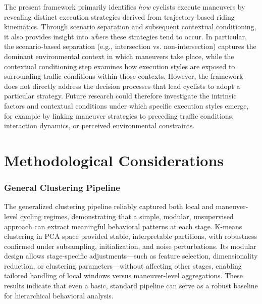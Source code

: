 The present framework primarily identifies \textit{how} cyclists execute maneuvers by revealing distinct execution strategies derived from trajectory-based riding kinematics. Through scenario separation and subsequent contextual conditioning, it also provides insight into \textit{where} these strategies tend to occur. In particular, the scenario-based separation (e.g., intersection vs. non-intersection) captures the dominant environmental context in which maneuvers take place, while the contextual conditioning step examines how execution styles are exposed to surrounding traffic conditions within those contexts. However, the framework does not directly address the decision processes that lead cyclists to adopt a particular strategy. Future research could therefore investigate the intrinsic factors and contextual conditions under which specific execution styles emerge, for example by linking maneuver strategies to preceding traffic conditions, interaction dynamics, or perceived environmental constraints.









\iffalse
\section{Methodological Considerations}


\subsubsection{General Clustering Pipeline}
The generalized clustering pipeline reliably captured both local and maneuver-level cycling regimes, demonstrating that a simple, modular, unsupervised approach can extract meaningful behavioral patterns at each stage. K-means clustering in PCA space provided stable, interpretable partitions, with robustness confirmed under subsampling, initialization, and noise perturbations. Its modular design allows stage-specific adjustments—such as feature selection, dimensionality reduction, or clustering parameters—without affecting other stages, enabling tailored handling of local windows versus maneuver-level aggregations. These results indicate that even a basic, standard pipeline can serve as a robust baseline for hierarchical behavioral analysis.

